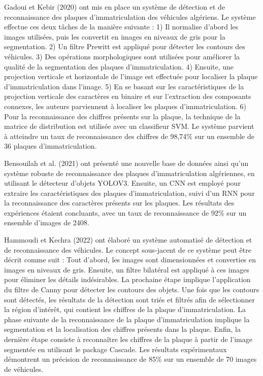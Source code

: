 Gadoui et Kebir (2020) \cite{gadoui-kebir-master} ont mis en place un système de détection et de reconnaissance des plaques d'immatriculation des véhicules algériens. Le système effectue ces deux tâches de la manière suivante : 1) Il normalise d'abord les images utilisées, puis les convertit en images en niveaux de gris pour la segmentation. 2) Un filtre Prewitt est appliqué pour détecter les contours des véhicules. 3) Des opérations morphologiques sont utilisées pour améliorer la qualité de la segmentation des plaques d'immatriculation. 4) Ensuite, une projection verticale et horizontale de l'image est effectuée pour localiser la plaque d'immatriculation dans l'image. 5) En se basant sur les caractéristiques de la projection verticale des caractères en binaire et sur l'extraction des composants connexes, les auteurs parviennent à localiser les plaques d'immatriculation. 6) Pour la reconnaissance des chiffres présents sur la plaque, la technique de la matrice de distribution est utilisée avec un classifieur SVM. Le système parvient à atteindre un taux de reconnaissance des chiffres de 98,74\% sur un ensemble de 36 plaques d'immatriculation. 


Bensouilah et al. (2021) \cite{bens} ont présenté une nouvelle base de données ainsi qu'un système robuste de reconnaissance des plaques d'immatriculation algériennes, en utilisant le détecteur d'objets YOLOV3. Ensuite, un CNN est employé pour extraire les caractéristiques des plaques d'immatriculation, suivi d'un RNN pour la reconnaissance des caractères présents sur les plaques. Les résultats des expériences étaient concluants, avec un taux de reconnaissance de 92\% sur un ensemble d'images de 2408.

Hammoudi et Kechra (2022) \cite{hammoudi-kechra-master} ont élaboré un système automatisé de détection et de reconnaissance des véhicules. Le concept sous-jacent de ce système peut être décrit comme suit : Tout d'abord, les images sont dimensionnées et converties en images en niveaux de gris. Ensuite, un filtre bilatéral est appliqué à ces images pour éliminer les détails indésirables. La prochaine étape implique l'application du filtre de Canny pour détecter les contours des objets. Une fois que les contours sont détectés, les résultats de la détection sont triés et filtrés afin de sélectionner la région d'intérêt, qui contient les chiffres de la plaque d'immatriculation.
La phase suivante de la reconnaissance de la plaque d'immatriculation implique la segmentation et la localisation des chiffres présents dans la plaque.
Enfin, la dernière étape consiste à reconnaître les chiffres de la plaque à partir de l'image segmentée en utilisant le package Cascade.
Les résultats expérimentaux démontrent un précision de reconnaissance de 85\%  sur un ensemble de 70 images de véhicules.

